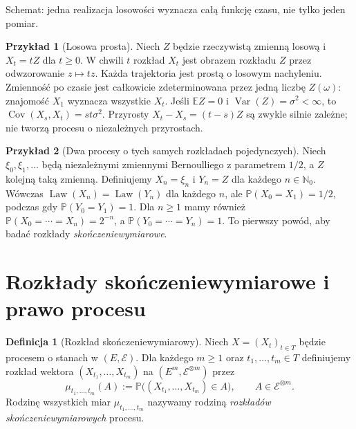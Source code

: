 \documentclass[11pt,a4paper,oneside]{report}
\numberwithin{equation}{chapter}
\theoremstyle{plain}
\theoremstyle{definition}
\newtheorem{definicja}{Definicja}[chapter]
\newtheorem{przyklad}{Przykład}[chapter]
\theoremstyle{remark}
\newcommand{\N}{\mathbb{N}}
\newcommand{\Prob}{\mathbb{P}}
\newcommand{\E}{\mathbb{E}}
\newcommand{\Var}{\operatorname{Var}}
\newcommand{\Cov}{\operatorname{Cov}}
\newcommand{\Law}{\operatorname{Law}}
\newcommand{\calE}{\mathcal{E}}
\begin{document}
\begin{center}
\par\smallskip\small Schemat: jedna realizacja losowości wyznacza całą funkcję czasu, nie tylko jeden pomiar.
\end{center}

\begin{przyklad}[Losowa prosta]
Niech $Z$ będzie rzeczywistą zmienną losową i $X_t=tZ$ dla $t\ge0$.
W chwili $t$ rozkład $X_t$ jest obrazem rozkładu $Z$ przez
odwzorowanie $z\mapsto tz$. Każda trajektoria jest prostą o losowym
nachyleniu. Zmienność po czasie jest całkowicie zdeterminowana przez
jedną liczbę $Z(\omega)$: znajomość $X_1$ wyznacza wszystkie $X_t$.
Jeśli $\E Z=0$ i $\Var(Z)=\sigma^2<\infty$, to
$\Cov(X_s,X_t)=st\sigma^2$. Przyrosty
$X_t-X_s=(t-s)Z$ są zwykle silnie zależne; nie tworzą procesu o
niezależnych przyrostach.
\end{przyklad}

\begin{przyklad}[Dwa procesy o tych samych rozkładach pojedynczych]
Niech $\xi_0,\xi_1,\ldots$ będą niezależnymi zmiennymi Bernoulliego
z parametrem $1/2$, a $Z$ kolejną taką zmienną. Definiujemy
$X_n=\xi_n$ i $Y_n=Z$ dla każdego $n\in\N_0$.
Wówczas $\Law(X_n)=\Law(Y_n)$ dla każdego $n$, ale
$\Prob(X_0=X_1)=1/2$, podczas gdy $\Prob(Y_0=Y_1)=1$.
Dla $n\ge1$ mamy również
$\Prob(X_0=\cdots=X_n)=2^{-n}$,
a $\Prob(Y_0=\cdots=Y_n)=1$.
To pierwszy powód, aby badać rozkłady \emph{skończeniewymiarowe}.
\end{przyklad}

\section{Rozkłady skończeniewymiarowe i prawo procesu}
\begin{definicja}[Rozkład skończeniewymiarowy]
Niech $X=(X_t)_{t\in T}$ będzie procesem o stanach w $(E,\calE)$.
Dla każdego $m\ge1$ oraz $t_1,\ldots,t_m\in T$ definiujemy
rozkład wektora $(X_{t_1},\ldots,X_{t_m})$ na
$(E^m,\calE^{\otimes m})$ przez
\[
\mu_{t_1,\ldots,t_m}(A)
:=\Prob\big((X_{t_1},\ldots,X_{t_m})\in A\big),
\qquad A\in\calE^{\otimes m}.
\]
Rodzinę wszystkich miar $\mu_{t_1,\ldots,t_m}$ nazywamy rodziną
\emph{rozkładów skończeniewymiarowych} procesu.
\end{definicja}
\end{document}
